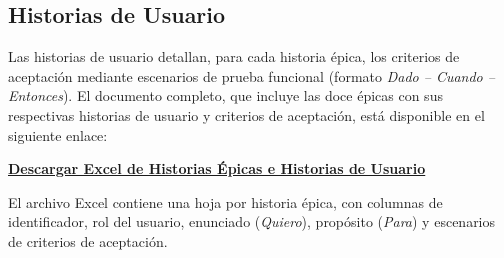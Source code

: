 \subsection{Historias de Usuario}

Las historias de usuario detallan, para cada historia épica, los criterios de aceptación
mediante escenarios de prueba funcional (formato \textit{Dado -- Cuando -- Entonces}).
El documento completo, que incluye las doce épicas con sus respectivas historias de usuario
y criterios de aceptación, está disponible en el siguiente enlace:

\vspace{0.4em}
\begin{center}
  \href{https://drive.google.com/uc?id=1Rqvc8YO-pXUc7-rpU93Pk1LDsg7gfyI4&export=download}{%
    \textcolor{bloodred}{\textbf{Descargar Excel de Historias Épicas e Historias de Usuario}}%
  }
\end{center}
\vspace{0.4em}

El archivo Excel contiene una hoja por historia épica, con columnas de identificador,
rol del usuario, enunciado (\textit{Quiero}), propósito (\textit{Para}) y escenarios de
criterios de aceptación.

